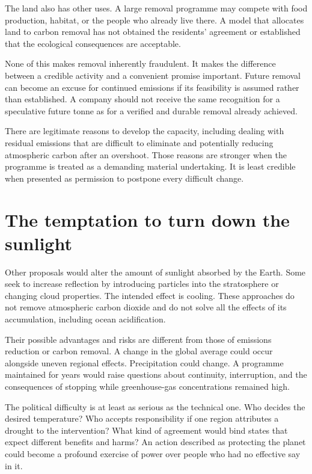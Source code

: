 \documentclass[12pt,a4paper]{book}
\begin{document}
The land also has other uses. A large removal programme may compete with food production, habitat, or the people who already live there. A model that allocates land to carbon removal has not obtained the residents' agreement or established that the ecological consequences are acceptable.

None of this makes removal inherently fraudulent. It makes the difference between a credible activity and a convenient promise important. Future removal can become an excuse for continued emissions if its feasibility is assumed rather than established. A company should not receive the same recognition for a speculative future tonne as for a verified and durable removal already achieved.

There are legitimate reasons to develop the capacity, including dealing with residual emissions that are difficult to eliminate and potentially reducing atmospheric carbon after an overshoot. Those reasons are stronger when the programme is treated as a demanding material undertaking. It is least credible when presented as permission to postpone every difficult change.

\section*{The temptation to turn down the sunlight}

Other proposals would alter the amount of sunlight absorbed by the Earth. Some seek to increase reflection by introducing particles into the stratosphere or changing cloud properties. The intended effect is cooling. These approaches do not remove atmospheric carbon dioxide and do not solve all the effects of its accumulation, including ocean acidification.

Their possible advantages and risks are different from those of emissions reduction or carbon removal. A change in the global average could occur alongside uneven regional effects. Precipitation could change. A programme maintained for years would raise questions about continuity, interruption, and the consequences of stopping while greenhouse-gas concentrations remained high.

The political difficulty is at least as serious as the technical one. Who decides the desired temperature? Who accepts responsibility if one region attributes a drought to the intervention? What kind of agreement would bind states that expect different benefits and harms? An action described as protecting the planet could become a profound exercise of power over people who had no effective say in it.
\end{document}
